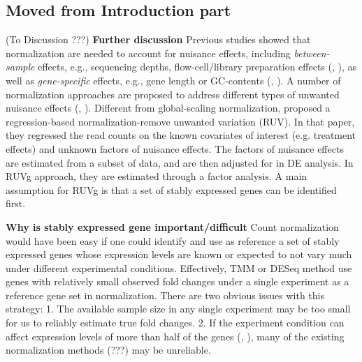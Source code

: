 \documentclass[letterpaper,12pt]{article}
\begin{document}



\subsection{Moved from Introduction part}



(To Discussion ???) {\bf Further discussion} Previous studies showed that
normalization are needed to account for nuisance effects, including
\textit{between-sample} effects, e.g., sequencing depths, flow-cell/library
preparation effects (\cite{bullard2010evaluation},
\cite{robinson2010scaling}), as well as \textit{gene-specific} effects, e.g.,
gene length or GC-contents (\cite{risso2011gc}, \cite{hansen2012removing}). A
number of normalization approaches are proposed to address different types of
unwanted nuisance effects (\cite{dillies2013comprehensive},
\cite{risso2014nat}). Different from global-scaling normalization,
\cite{risso2014nat}  proposed a regression-based normalization-remove unwanted
variation (RUV).  In that paper, they regressed the read counts on the known
covariates of interest (e.g. treatment effects) and unknown factors of
nuisance effects. The factors of nuisance effects are estimated from a subset
of data, and are then adjusted for in DE analysis. In RUVg approach, they are
estimated through a factor analysis. A main assumption for RUVg is that a set
of stably expressed genes can be identified first.


\textbf{Why is stably expressed gene important/difficult} Count normalization would have been easy if one could identify and use as reference a set of stably expressed genes whose expression levels are known or expected to not vary much under different experimental conditions.  Effectively, TMM or DESeq method use genes with relatively small observed fold changes under a single experiment as a reference gene set in normalization. There are two obvious issues with this strategy: 1. The available sample size in any single experiment may be too small for us to reliably estimate true fold changes. 2. If the experiment condition can affect expression levels of more than half of the genes (\cite{loven2012revisiting}, \cite{wu2013use}), many of the existing normalization methods (???) may be unreliable.  
\end{document}
